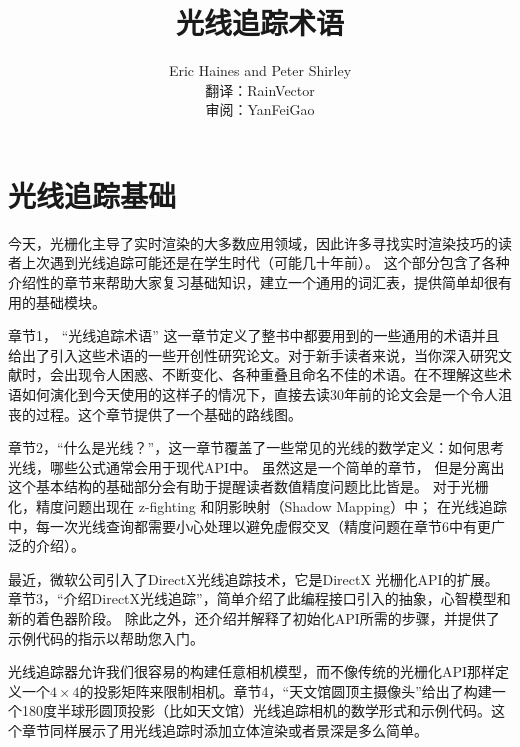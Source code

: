 \documentclass[12pt]{article}
\begin{document}
 
 
 
\title{光线追踪术语}%
\author{Eric Haines and Peter Shirley \\
	翻译：RainVector \\
	审阅：YanFeiGao} 
 
\maketitle
\tableofcontents
 \section{光线追踪基础}
今天，光栅化主导了实时渲染的大多数应用领域，因此许多寻找实时渲染技巧的读者上次遇到光线追踪可能还是在学生时代（可能几十年前）。
这个部分包含了各种介绍性的章节来帮助大家复习基础知识，建立一个通用的词汇表，提供简单却很有用的基础模块。

章节\color{blue}1\color{black}， “光线追踪术语” 这一章节定义了整书中都要用到的一些通用的术语并且给出了引入这些术语的一些开创性研究论文。对于新手读者来说，当你深入研究文献时，会出现令人困惑、不断变化、各种重叠且命名不佳的术语。在不理解这些术语如何演化到今天使用的这样子的情况下，直接去读30年前的论文会是一个令人沮丧的过程。这个章节提供了一个基础的路线图。

章节\color{blue}2\color{black}，“什么是光线？”，这一章节覆盖了一些常见的光线的数学定义：如何思考光线，哪些公式通常会用于现代API中。 虽然这是一个简单的章节，
但是分离出这个基本结构的基础部分会有助于提醒读者数值精度问题比比皆是。
对于光栅化，精度问题出现在 z-fighting 和阴影映射（Shadow Mapping）中；
在光线追踪中，每一次光线查询都需要小心处理以避免虚假交叉（精度问题在章节6中有更广泛的介绍）。

最近，微软公司引入了DirectX光线追踪技术，它是DirectX 光栅化API的扩展。章节\color{blue}3\color{black}，“介绍DirectX光线追踪”，简单介绍了此编程接口引入的抽象，心智模型和新的着色器阶段。
除此之外，还介绍并解释了初始化API所需的步骤，并提供了示例代码的指示以帮助您入门。

光线追踪器允许我们很容易的构建任意相机模型，而不像传统的光栅化API那样定义一个$4\times 4$的投影矩阵来限制相机。章节\color{blue}4\color{black}，“天文馆圆顶主摄像头”给出了构建一个180度半球形圆顶投影（比如天文馆）光线追踪相机的数学形式和示例代码。这个章节同样展示了用光线追踪时添加立体渲染或者景深是多么简单。
\end{document}
